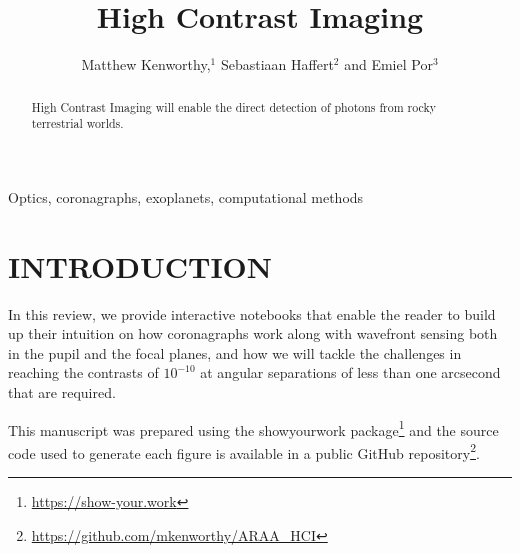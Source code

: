 \documentclass[letterpaper]{ar-1col}
\newcommand{\project}[1]{\textsf{#1}}
\begin{document}


\title{High Contrast Imaging}

\author{Matthew Kenworthy,$^1$ Sebastiaan Haffert$^2$ and Emiel Por$^3$
  }

\begin{abstract}
High Contrast Imaging will enable the direct detection of photons from rocky terrestrial worlds.
\end{abstract}

\begin{keywords}
 Optics, coronagraphs, exoplanets, computational methods

\end{keywords}
\maketitle

\tableofcontents

\section{INTRODUCTION}
\label{sec:intro}



In this review, we provide interactive notebooks that enable the reader to build up their intuition on how coronagraphs work along with wavefront sensing both in the pupil and the focal planes, and how we will tackle the challenges in reaching the contrasts of $10^{-10}$ at angular separations of less than one arcsecond that are required.


\begin{armarginnote}[]
\end{armarginnote}

This manuscript was prepared using the \project{showyourwork} package\footnote{\url{https://show-your.work}} and the source code used to generate each figure is available in a public \project{GitHub} repository\footnote{\url{https://github.com/mkenworthy/ARAA_HCI}}.
\end{document}
